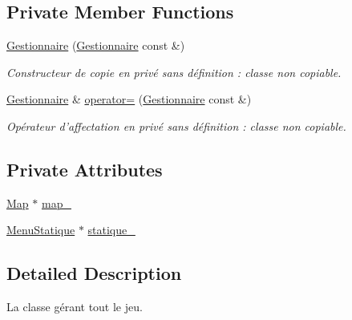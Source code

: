 \subsection*{Private Member Functions}
\begin{DoxyCompactItemize}
\item 
\hypertarget{classGestionnaire_a46f2fe0bbaa38367cb6b8e475b020b18}{\hyperlink{classGestionnaire_a46f2fe0bbaa38367cb6b8e475b020b18}{Gestionnaire} (\hyperlink{classGestionnaire}{Gestionnaire} const \&)}\label{classGestionnaire_a46f2fe0bbaa38367cb6b8e475b020b18}

\begin{DoxyCompactList}\small\item\em Constructeur de copie en privé sans définition \-: classe non copiable. \end{DoxyCompactList}\item 
\hypertarget{classGestionnaire_a2489352e6c4f0e44ec5eece228de5794}{\hyperlink{classGestionnaire}{Gestionnaire} \& \hyperlink{classGestionnaire_a2489352e6c4f0e44ec5eece228de5794}{operator=} (\hyperlink{classGestionnaire}{Gestionnaire} const \&)}\label{classGestionnaire_a2489352e6c4f0e44ec5eece228de5794}

\begin{DoxyCompactList}\small\item\em Opérateur d'affectation en privé sans définition \-: classe non copiable. \end{DoxyCompactList}\end{DoxyCompactItemize}
\subsection*{Private Attributes}
\begin{DoxyCompactItemize}
\item 
\hyperlink{classMap}{Map} $\ast$ \hyperlink{classGestionnaire_a25cc65d005529f0cc57b6a868c1ed158}{map\-\_\-}
\item 
\hyperlink{classMenuStatique}{Menu\-Statique} $\ast$ \hyperlink{classGestionnaire_a2504521971b4ef8b9bfee050c368bb7a}{statique\-\_\-}
\end{DoxyCompactItemize}


\subsection{Detailed Description}
La classe gérant tout le jeu. 

